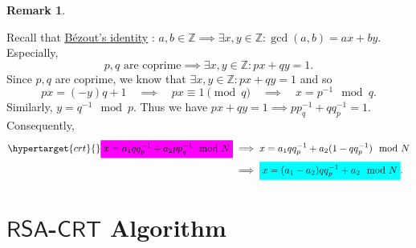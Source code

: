 \documentclass{article}
\newcommand{\mathcolorbox}[2]{\colorbox{#1}{$\displaystyle #2$}}
\newcommand{\rsa}{\mathsf{RSA}}
\theoremstyle{definition}
\newtheorem{remark}{Remark}
\begin{document}
\newpage
\begin{remark}\hypertarget{rmk1}{}
	Recall that \hyperlink{lem}{Bézout's identity} : $
	a,b\in\mathbb{Z}\implies\exists x,y\in\mathbb{Z}:\gcd(a,b)=ax+by.
	$ Especially, \[
	\text{$p,q$ are coprime}\implies\exists x,y\in\mathbb{Z}: px+qy=1.
	\] Since $p,q$ are coprime, we know that $\exists x,y\in\mathbb{Z}:px+qy=1$ and so \[
	px=(-y)q+1\quad\implies\quad px\equiv1\pmod{q}\quad\implies\quad x=p^{-1}\mod{q}.
	\] Similarly, $y=q^{-1}\mod{p}$. Thus we have $px+qy=1\implies pp_{q}^{-1}+qq_{p}^{-1}=1$. Consequently, \begin{align*}
		\hypertarget{crt}{}\mathcolorbox{-green}{x=a_1qq_p^{-1}+a_2pp_q^{-1}\mod{N}} &\implies x=a_1qq_p^{-1}+a_2(1-qq_{p}^{-1})\mod{N}\\
		&\implies \mathcolorbox{-red}{x=(a_1-a_2)qq_p^{-1}+a_2\mod{N}}.
	\end{align*}
\end{remark}
\vspace{4pt}
\section{$\rsa$-$\mathsf{CRT}$ Algorithm}
\end{document}
